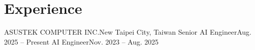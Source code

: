 \section{Experience}
  \resumeSubHeadingListStart

    \resumeSubheading
      {ASUSTEK COMPUTER INC.}{New Taipei City, Taiwan}
      {Senior AI Engineer}{Aug. 2025 -- Present}
    \resumeSubSubheading
      {AI Engineer}{Nov. 2023 -- Aug. 2025}
